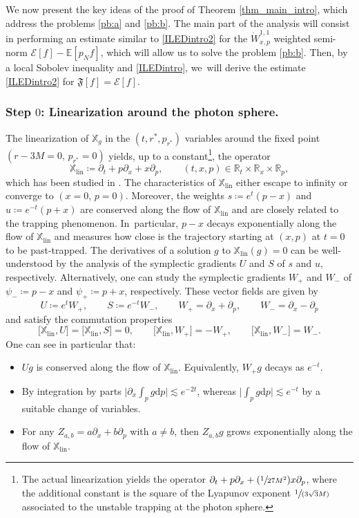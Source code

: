 \documentclass[JEP,XML,SOM,Unicode,published]{cedram}
\newcommand{\Psfrac}[2]{(\sfrac{#1}{#2})}
\newcommand{\spfrac}[2]{\sfrac{#1}{(#2)}}
\theoremstyle{plain}
\theoremstyle{definition}
\newcommand\R{{\mathbb{R}}}
\newcommand\T{{\mathbb{X}}}
\newcommand\dr{{\mathrm{d}}}
\begin{document}
We now present the key ideas of the proof of Theorem \ref{thm_main_intro}, which address the problems \eqref{pb:a} and \eqref{pb:b}. The main part of the analysis will consist in performing an estimate similar to \eqref{ILEDintro2} for the $\dot{W}^{1,1}_{x,p}$ weighted semi-norm $\mathcal{E}[f]-\mathbb{E}[p_Nf]$, which will allow us to solve the problem \eqref{pb:b}. Then, by a local Sobolev inequality and \eqref{ILEDintro}, we~will derive the estimate \eqref{ILEDintro2} for $\mathfrak{F}[f]= \mathcal{E}[f]$.

\subsubsection{Step $0$: Linearization around the photon sphere.} \label{linearised_ph_sph} The linearization of $\T_g$ in the $(t,r^*,p_{r^*})$ variables around the fixed point $(r-3M=0,\,p_{r^*}=0)$ yields, up to a constant\footnote{The actual linearization yields the operator $\partial_t +p \partial_x+\Psfrac{1}{27M^2}x \partial_p$, where the additional constant is the square of the Lyapunov exponent $\spfrac{1}{3\sqrt{3}M}$ associated to the unstable trapping at the photon sphere. }, the operator
\[
\T_{\mathrm{lin}}\coloneqq\partial_t +p \partial_x+x \partial_p, \qquad (t,x,p) \in \R_t \times \R_x \times \R_p,
\]
which has been studied in \cite{VV24}. The characteristics of $\T_{\mathrm{lin}}$ either escape to infinity or converge to $(x=0,\, p=0)$. Moreover, the weights $s\coloneqq e^t(p-x)$ and $u\coloneqq e^{-t}(p+x)$ are conserved along the flow of $\T_{\mathrm{lin}}$ and are closely related to the trapping phenomenon. In~particular, $p-x$ decays exponentially along the flow of $\T_{\mathrm{lin}}$ and measures how close is the trajectory starting at $(x,p)$ at $t=0$ to be past-trapped.
The derivatives of a solution $g$ to $\T_{\mathrm{lin}}(g)=0$ can be well-understood by the analysis of the symplectic gradients $U$ and $S$ of $s$ and $u$, respectively. Alternatively, one can study the symplectic gradients $W_+$ and $W_-$ of $\psi_-\coloneqq p-x$ and $\psi_+\coloneqq p+x$, respectively. These vector fields are given by
\[
U \coloneqq e^tW_+, \qquad S \coloneqq e^{-t}W_-, \qquad W_+=\partial_x+ \partial_p, \qquad W_- = \partial_x - \partial_p
\]
and satisfy the commutation properties
\[
\bigl[\T_{\mathrm{lin}}, U \bigr]= \bigl[\T_{\mathrm{lin}}, S \bigr]=0,\qquad \bigl[ \T_{\mathrm{lin}},W_+ \bigr]=-W_+,\qquad \bigl[ \T_{\mathrm{lin}},W_- \bigr]=W_-.
\]
One can see in particular that:
\begin{itemize}
\item $Ug$ is conserved along the flow of $\T_{\mathrm{lin}}$. Equivalently, $W_+g$ decays as $e^{-t}$.
\item By integration by parts $\big|\partial_x \int_p g \dr p\big| \lesssim e^{-2t}$, whereas $\big| \int_p g \dr p\big| \lesssim e^{-t}$ by a suitable change of variables.
\item For any $Z_{a,b}=a\partial_x+b\partial_p$ with $a \neq b$, then $Z_{a,b}g$ grows exponentially along the flow of $\T_{\mathrm{lin}}$.
\end{itemize}
\end{document}
